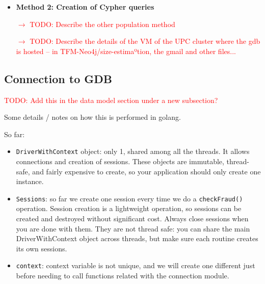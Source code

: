 \begin{itemize}

\item {\textbf{Method 2: Creation of Cypher queries\\}}

\textcolor{red}{$\rightarrow$ TODO: Describe the other population method}

\textcolor{red}{$\rightarrow$ TODO: Describe the details of the VM of the UPC cluster where the gdb is hosted -- in TFM-Neo4j/size-estimaºtion, the gmail and other files...}

\end{itemize}


\subsection{Connection to GDB}

\textcolor{red}{TODO: Add this in the data model section under a new subsection?}

Some details / notes on how this is performed in golang.


So far:
\begin{itemize}
  \item \texttt{DriverWithContext} object: only 1, shared among all the threads. It allows connections and creation of sessions. These objects are immutable, thread-safe, and fairly expensive to create, so your application should only create one instance.
  \item \texttt{Sessions}: so far we create one session every time we do a \texttt{checkFraud()} operation.
  Session creation is a lightweight operation, so sessions can be created and destroyed without significant cost. Always close sessions when you are done with them. They are not thread safe: you can share the main DriverWithContext object
  across threads, but make sure each routine creates its own sessions.
  \item \texttt{context}: context variable is not unique, and we will create one different just before needing to call functions related with the connection module.
\end{itemize}



